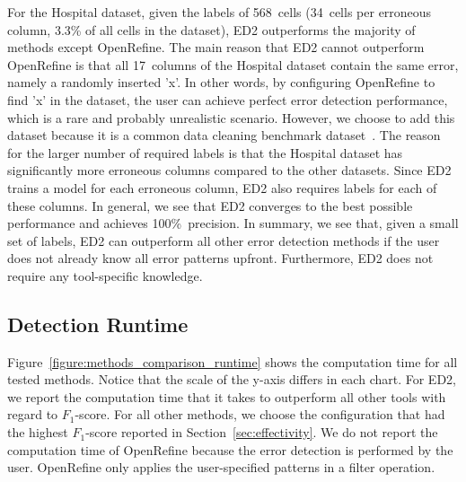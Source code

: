 \begin{figure*}[t!]
	\centering
	\subfigure
	{
		\label{figure:runtime_blackoak}
		
	}
	\subfigure
	{
		\label{figure:runtime_flights}
		
	}
	\subfigure
	{
		\label{figure:runtime_hospital}
		
		
	}	
	\caption{Runtime analysis of different error detection methods.}
	\label{figure:methods_comparison_runtime}
\end{figure*}

For the Hospital dataset, given the labels of 568~cells (34~cells per erroneous column, 3.3\% of all cells in the dataset), ED2 outperforms the majority of methods except OpenRefine.
The main reason that ED2 cannot outperform OpenRefine is that all 17~columns of the Hospital dataset contain the same error, namely a randomly inserted 'x'. In other words, by configuring OpenRefine to find 'x' in the dataset, the user can achieve perfect error detection performance, which is a rare and probably unrealistic scenario.
However, we choose to add this dataset because it is a common data cleaning benchmark dataset~\cite{rekatsinas2017holoclean, chu2013holistic, dallachiesa2013nadeef}. 
The reason for the larger number of required labels is that the Hospital dataset has significantly more erroneous columns compared to the other datasets. Since ED2 trains a model for each erroneous column, ED2 also requires labels for each of these columns. 
In general, we see that ED2 converges to the best possible performance and achieves 100\%~precision. 
In summary, we see that, given a small set of labels, ED2 can outperform all other error detection methods if the user does not already know all error patterns upfront. Furthermore, ED2 does not require any tool-specific knowledge.


\subsection{Detection Runtime}
\label{sec:runtime}

Figure~\ref{figure:methods_comparison_runtime} shows the computation time for all tested methods. Notice that the scale of the y-axis differs in each chart.
For ED2, we report the computation time that it takes to outperform all other tools with regard to $F_1$-score.
For all other methods, we choose the configuration that had the highest $F_1$-score reported in Section~\ref{sec:effectivity}.
We do not report the computation time of OpenRefine because the error detection is performed by the user. OpenRefine only applies the user-specified patterns in a filter operation.

